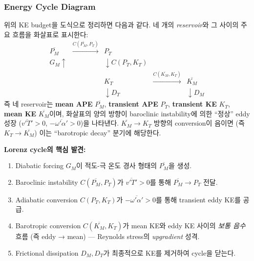 \subsubsection{Energy Cycle Diagram}

위의 KE budget을 
도식으로 정리하면 다음과 같다.  네 개의 \emph{reservoir}와 그 사이의
주요 흐름을 화살표로 표시한다:
\[
\begin{array}{ccccc}
  \overline{P_M} & \xrightarrow{C(\overline{P_M},P_T)} & P_T & & \\
  {\scriptstyle G_M\uparrow} & & {\scriptstyle\downarrow C(P_T,K_T)} & & \\
  & & K_T & \xrightarrow{C(\overline{K_M},K_T)} & \overline{K_M} \\
  & & {\scriptstyle\downarrow D_T} & & {\scriptstyle\downarrow D_M}
\end{array}
\]
즉 네 reservoir는
\textbf{mean APE} $\overline{P_M}$,
\textbf{transient APE} $P_T$,
\textbf{transient KE} $K_T$,
\textbf{mean KE} $\overline{K_M}$이며,
화살표의 양의 방향이 baroclinic instability에 의한 ``정상'' eddy 성장
($\overline{v'T'}>0$, $-\overline{\omega'\alpha'}>0$)을 나타낸다.
$\overline{K_M}\to K_T$ 방향의 conversion이 음이면 (즉 $K_T\to\overline{K_M}$)
이는 ``barotropic decay'' 분기에 해당한다.

\medskip

\begin{remarkbox}
\textbf{Lorenz cycle의 핵심 발견:}
\begin{enumerate}
  \item Diabatic forcing $G_M$이 적도-극 온도 경사 형태의 $\overline{P_M}$을 생성.
  \item Baroclinic instability $C(\overline{P_M}, P_T)$가 $\overline{v'T'}>0$를 통해 $\overline{P_M}\to P_T$ 전달.
  \item Adiabatic conversion $C(P_T, K_T)$가 $-\overline{\omega'\alpha'}>0$를 통해 transient eddy KE를 공급.
  \item Barotropic conversion $C(\overline{K_M}, K_T)$가 mean KE와 eddy KE 사이의 \emph{보통 음수} 흐름 (즉 eddy → mean) — Reynolds stress의 \textit{upgradient} 성격.
  \item Frictional dissipation $D_M, D_T$가 최종적으로 KE를 제거하여 cycle을 닫는다.
\end{enumerate}
\end{remarkbox}

